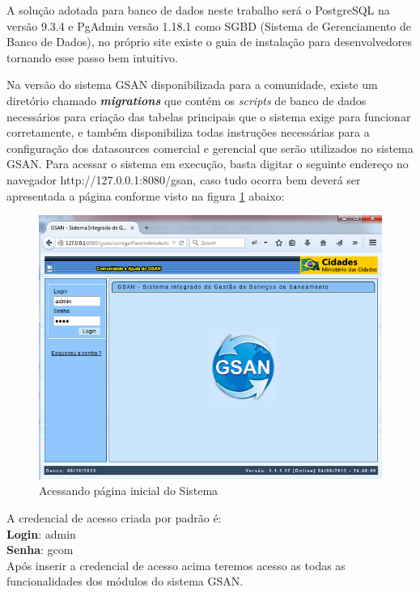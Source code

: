 A solução adotada para banco de dados neste trabalho será o PostgreSQL na versão 9.3.4 e PgAdmin versão 1.18.1 como SGBD (Sistema de Gerenciamento de Banco de Dados), no próprio site existe o guia de instalação para desenvolvedores tornando esse passo bem intuitivo.

Na versão do sistema GSAN disponibilizada para a comunidade, existe um diretório chamado \textbf{\textit{migrations}} que contém os \textit{scripts} de banco de dados necessários para criação das tabelas principais que o sistema exige para funcionar corretamente, e também disponibiliza todas instruções necessárias para a configuração dos datasources comercial e gerencial que serão utilizados no sistema GSAN.
Para acessar o sistema em execução, basta digitar o seguinte endereço no navegador http://127.0.0.1:8080/gsan, caso tudo ocorra bem deverá ser apresentada a página conforme visto na figura \ref{figura:acessoPaginaInicial} abaixo:

\begin{figure}[H]
	\centering
	\caption{Acessando página inicial do Sistema}
	\label{figura:acessoPaginaInicial}	
	\includegraphics{figuras/gsan_online.png}	
\end{figure}


A credencial de acesso criada por padrão é: \\
\textbf{Login}: admin \\
\textbf{Senha}: gcom \\
Após inserir a credencial de acesso acima teremos acesso as todas as funcionalidades dos módulos do sistema GSAN.


